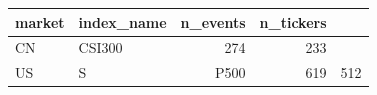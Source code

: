\begin{tabular}{llrr}
\toprule
market & index_name & n_events & n_tickers \\
\midrule
CN & CSI300 & 274 & 233 \\
US & S&P500 & 619 & 512 \\
\bottomrule
\end{tabular}
